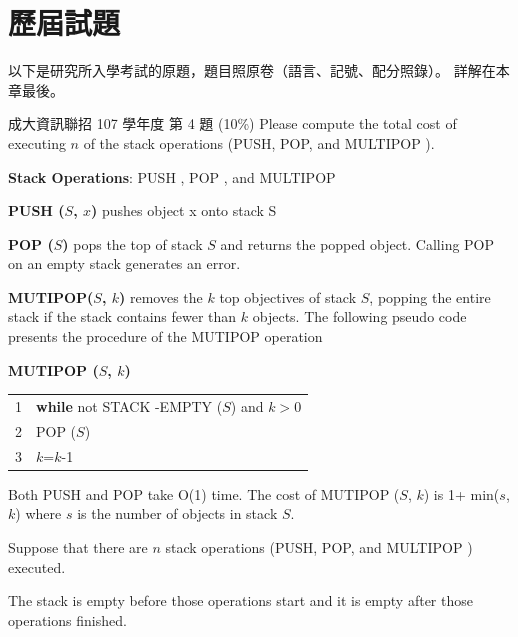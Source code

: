 \section{歷屆試題}
\label{sec:amo-pastexam}

以下是研究所入學考試的原題，題目照原卷（語言、記號、配分照錄）。 詳解在本章最後。

\begin{pastexam}[label={px:amo-1}]{成大資訊聯招 107 學年度 第 4 題}
(10\%) Please compute the total cost of executing $n$ of the stack operations (PUSH, POP,
and MULTIPOP ).

\textbf{Stack Operations}: PUSH , POP , and MULTIPOP

\textbf{PUSH ($S$, $x$)} pushes object x onto stack S

\textbf{POP ($S$)} pops the top of stack $S$ and returns the popped object. Calling POP on
an empty stack generates an error.

\textbf{MUTIPOP($S$, $k$)} removes the $k$ top objectives of stack $S$, popping the entire
stack if the stack contains fewer than $k$ objects. The following pseudo code presents the
procedure of the MUTIPOP operation

\textbf{MUTIPOP ($S$, $k$)}

\begin{tabular}{ll}
1 & \textbf{while} not STACK -EMPTY ($S$) and $k>0$ \\
2 & \quad POP ($S$) \\
3 & \quad $k$=$k$-1
\end{tabular}

Both PUSH and POP take O(1) time. The cost of MUTIPOP ($S$, $k$) is 1+ min($s$, $k$) where
$s$ is the number of objects in stack $S$.

Suppose that there are $n$ stack operations (PUSH, POP, and MULTIPOP ) executed.

The stack is empty before those operations start and it is empty after those operations
finished.
\end{pastexam}

